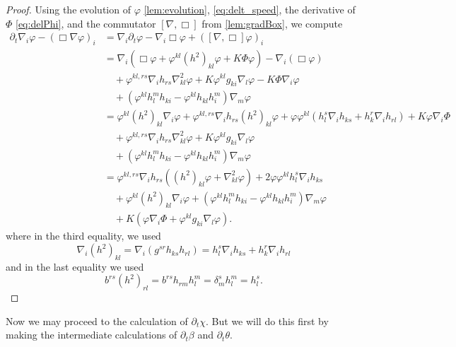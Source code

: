 \documentclass{amsart}
\begin{document}
\begin{proof}
Using the evolution of \(\varphi\) \cref{lem:evolution}, \cref{eq:delt_speed}, the derivative of \(\Phi\) \cref{eq:delPhi}, and the commutator \([\nabla, \Box]\) from \cref{lem:gradBox}, we compute
\[
\begin{split}
\partial_{t}\nabla_i \varphi - (\Box\nabla \varphi)_{i} &= \nabla_i \partial_t \varphi - \nabla_i \Box \varphi + ([\nabla, \Box] \varphi)_i \\
&= \nabla_i \left(\Box\varphi + \varphi^{kl}(h^2)_{kl}\varphi + K \Phi\varphi\right) - \nabla_i (\Box\varphi) \\
&\quad + \varphi^{kl,rs} \nabla_i h_{rs} \nabla^2_{kl} \varphi + K\varphi^{kl}g_{ki} \nabla_l \varphi - K\Phi\nabla_i \varphi \\
&\quad + (\varphi^{kl}h^{m}_{l}h_{ki} - \varphi^{kl}h_{kl}h^{m}_{i}) \nabla_m \varphi \\
&= \varphi^{kl}(h^2)_{kl}\nabla_i \varphi + \varphi^{kl,rs}\nabla_i h_{rs} (h^2)_{kl}\varphi + \varphi\varphi^{kl}(h^s_l \nabla_i h_{ks} + h^r_k \nabla_i h_{rl}) + K \varphi\nabla_i\Phi \\
&\quad + \varphi^{kl,rs} \nabla_i h_{rs} \nabla^2_{kl} \varphi + K\varphi^{kl}g_{ki}\nabla_l \varphi \\
&\quad + (\varphi^{kl}h^{m}_{l}h_{ki} - \varphi^{kl}h_{kl}h^{m}_{i}) \nabla_m \varphi \\
&= \varphi^{kl,rs}\nabla_i h_{rs} \left((h^2)_{kl}\varphi + \nabla^2_{kl} \varphi\right) + 2 \varphi\varphi^{kl} h^s_l \nabla_i h_{ks} \\
&\quad + \varphi^{kl}(h^2)_{kl}\nabla_i \varphi + (\varphi^{kl}h^{m}_{l}h_{ki} - \varphi^{kl}h_{kl}h^{m}_{i}) \nabla_m \varphi \\
&\quad + K \left(\varphi\nabla_i\Phi + \varphi^{kl}g_{ki}\nabla_l \varphi\right).
\end{split}
\]
where in the third equality, we used
\[
\nabla_i (h^2)_{kl} = \nabla_i (g^{sr} h_{ks} h_{rl}) = h^s_l \nabla_i h_{ks} + h^r_k \nabla_i h_{rl}
\]
and in the last equality we used
\[
b^{rs} (h^2)_{rl} = b^{rs} h_{rm} h^m_l = \delta^s_m h^m_l = h^s_l.
\]
\end{proof}

Now we may proceed to the calculation of \(\partial_t \chi\). But we will do this first by making the intermediate calculations of \(\partial_t \beta\) and \(\partial_t \theta\).
\end{document}
